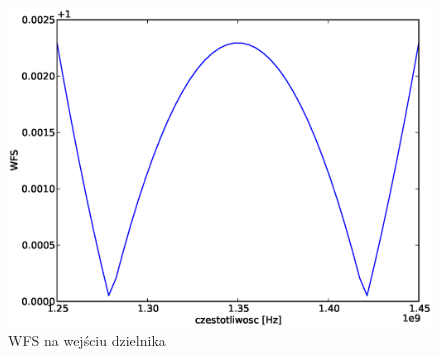 \documentclass[rep.tex]{subfiles}
\begin{document}
\begin{figure}[!htbp]
  \centering
  \includegraphics[scale=0.5]{fig/zad14/wfs}
  \caption{WFS na wejściu dzielnika}
  \label{fig:zad14:wfs}
\end{figure}
\end{document}
